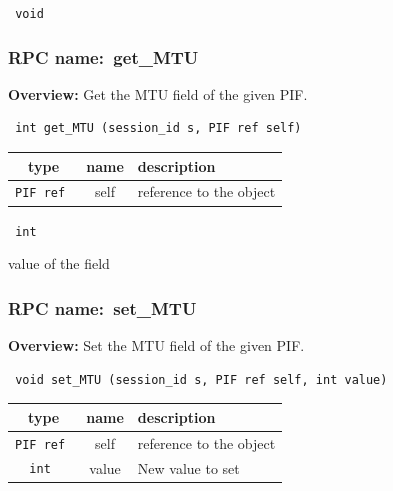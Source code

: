\vspace{0.3cm}

{\tt 
void
}



\vspace{0.3cm}
\vspace{0.3cm}
\vspace{0.3cm}
\subsubsection{RPC name:~get\_MTU}

{\bf Overview:} 
Get the MTU field of the given PIF.

\begin{verbatim} int get_MTU (session_id s, PIF ref self)\end{verbatim}



 
\vspace{0.3cm}
\begin{tabular}{|c|c|p{7cm}|}
 \hline
{\bf type} & {\bf name} & {\bf description} \\ \hline
{\tt PIF ref } & self & reference to the object \\ \hline 

\end{tabular}

\vspace{0.3cm}

{\tt 
int
}


value of the field
\vspace{0.3cm}
\vspace{0.3cm}
\vspace{0.3cm}
\subsubsection{RPC name:~set\_MTU}

{\bf Overview:} 
Set the MTU field of the given PIF.

\begin{verbatim} void set_MTU (session_id s, PIF ref self, int value)\end{verbatim}



 
\vspace{0.3cm}
\begin{tabular}{|c|c|p{7cm}|}
 \hline
{\bf type} & {\bf name} & {\bf description} \\ \hline
{\tt PIF ref } & self & reference to the object \\ \hline 

{\tt int } & value & New value to set \\ \hline 

\end{tabular}


